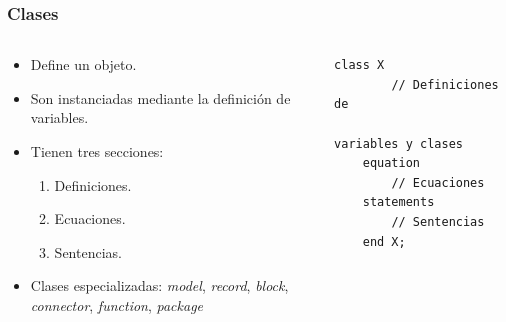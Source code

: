 \documentclass[aspectratio=169,10pt]{beamer}
\begin{document}
\begin{frame}[fragile]
\frametitle{Clases} 
\begin{columns}  
\begin{block}{}
\begin{itemize}
    \item Define un objeto.
    \item Son instanciadas mediante la definición de variables.
    \item Tienen tres secciones:
        \begin{enumerate}
            \item Definiciones.
            \item Ecuaciones.
            \item Sentencias.
        \end{enumerate}
    \item Clases especializadas:  \textit{model}, \textit{record}, \textit{block}, \textit{connector}, \textit{function}, \textit{package}   
\end{itemize}
\end{block}{}
\begin{lstlisting}[style=base]
    class X
        // Definiciones de 
                variables y clases   
    equation
        // Ecuaciones
    statements
        // Sentencias
    end X;   
\end{lstlisting}
\end{columns}
\end{frame}

%
\end{document}
